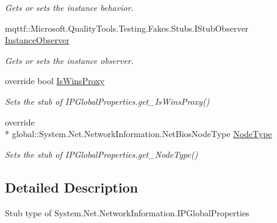 \begin{DoxyCompactItemize}
\begin{DoxyCompactList}\small\item\em Gets or sets the instance behavior.\end{DoxyCompactList}\item 
mqttf\-::\-Microsoft.\-Quality\-Tools.\-Testing.\-Fakes.\-Stubs.\-I\-Stub\-Observer \hyperlink{class_system_1_1_net_1_1_network_information_1_1_fakes_1_1_stub_i_p_global_properties_aef31bf0efc89a81616beffe9418e490f}{Instance\-Observer}
\begin{DoxyCompactList}\small\item\em Gets or sets the instance observer.\end{DoxyCompactList}\item 
override bool \hyperlink{class_system_1_1_net_1_1_network_information_1_1_fakes_1_1_stub_i_p_global_properties_a0fb181a577b974ab892e7da0da84ccd8}{Is\-Wins\-Proxy}
\begin{DoxyCompactList}\small\item\em Sets the stub of I\-P\-Global\-Properties.\-get\-\_\-\-Is\-Wins\-Proxy()\end{DoxyCompactList}\item 
override \\*
global\-::\-System.\-Net.\-Network\-Information.\-Net\-Bios\-Node\-Type \hyperlink{class_system_1_1_net_1_1_network_information_1_1_fakes_1_1_stub_i_p_global_properties_a6340c7d52de76d7e6a6e470a432ac49a}{Node\-Type}
\begin{DoxyCompactList}\small\item\em Sets the stub of I\-P\-Global\-Properties.\-get\-\_\-\-Node\-Type()\end{DoxyCompactList}\end{DoxyCompactItemize}


\subsection{Detailed Description}
Stub type of System.\-Net.\-Network\-Information.\-I\-P\-Global\-Properties



